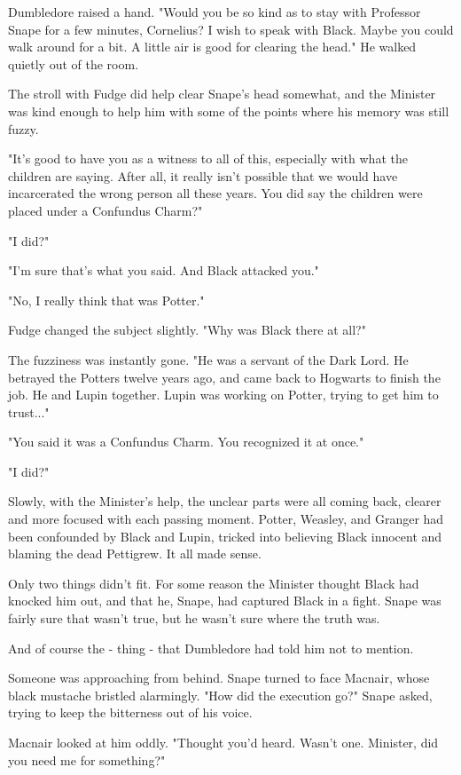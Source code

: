 Dumbledore raised a hand. "Would you be so kind as to stay with Professor Snape for a few minutes, Cornelius? I wish to speak with Black. Maybe you could walk around for a bit. A little air is good for clearing the head." He walked quietly out of the room.

The stroll with Fudge did help clear Snape's head somewhat, and the Minister was kind enough to help him with some of the points where his memory was still fuzzy.

"It's good to have you as a witness to all of this, especially with what the children are saying. After all, it really isn't possible that we would have incarcerated the wrong person all these years. You did say the children were placed under a Confundus Charm?"

"I did?"

"I'm sure that's what you said. And Black attacked you."

"No, I really think that was Potter."

Fudge changed the subject slightly. "Why was Black there at all?"

The fuzziness was instantly gone. "He was a servant of the Dark Lord. He betrayed the Potters twelve years ago, and came back to Hogwarts to finish the job. He and Lupin together. Lupin was working on Potter, trying to get him to trust..."

"You said it was a Confundus Charm. You recognized it at once."

"I did?"

Slowly, with the Minister's help, the unclear parts were all coming back, clearer and more focused with each passing moment. Potter, Weasley, and Granger had been confounded by Black and Lupin, tricked into believing Black innocent and blaming the dead Pettigrew. It all made sense.

Only two things didn't fit. For some reason the Minister thought Black had knocked him out, and that he, Snape, had captured Black in a fight. Snape was fairly sure that wasn't true, but he wasn't sure where the truth was.

And of course the - thing - that Dumbledore had told him not to mention.

Someone was approaching from behind. Snape turned to face Macnair, whose black mustache bristled alarmingly. "How did the execution go?" Snape asked, trying to keep the bitterness out of his voice.

Macnair looked at him oddly. "Thought you'd heard. Wasn't one. Minister, did you need me for something?"

